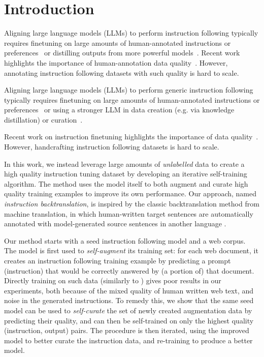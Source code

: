 \section{Introduction}


Aligning large language models (LLMs) to perform instruction following typically requires finetuning on large amounts of human-annotated instructions or preferences~\citep{ouyang2022training,touvron2023llama, bai2022training}  or distilling outputs from more powerful models~\citep{wang2022self,honovich2022unnatural,alpaca,vicuna2023,peng2023instruction,xu2023wizardlm}.
Recent work highlights the importance of human-annotation data quality~\citep{zhou2023lima,kopf2023openassistant}. However, annotating instruction following datasets with such quality is hard to scale. 


Aligning large language models (LLMs) to perform generic instruction following typically requires finetuning on large amounts of human-annotated instructions or preferences~\citep{ouyang2022training,touvron2023llama, bai2022training} or using a stronger LLM in data creation (e.g. via knowledge distillation) or curation~\citep{wang2022self,honovich2022unnatural,alpaca,vicuna2023,peng2023instruction,xu2023wizardlm}.
 
Recent work on instruction finetuning highlights the importance of data quality~\cite{zhou2023lima,kopf2023openassistant}. However, handcrafting instruction following datasets is hard to scale. 
\fi

In this work, we instead leverage large amounts of \emph{unlabelled} data to create a high quality instruction tuning dataset by developing an iterative self-training algorithm. The method uses the model itself to both augment  and curate
high quality  training examples to improve its own performance. Our approach, named {\em instruction backtranslation}, is inspired by the classic {backtranslation} method from machine translation, in which human-written target sentences are automatically annotated with model-generated source sentences in another language \citep{sennrich2015improving}. 

Our method starts with a seed instruction following model and a web corpus. The model is first used to \textit{self-augment} its training set: for each web document, it creates an instruction following training example by predicting a  prompt (instruction) that would be correctly answered by (a portion of) that document. Directly training on such data (similarly to \cite{koksal2023longform}) gives poor results in our experiments, 
both because of the mixed quality of human written web text, and noise in the generated instructions. To remedy this, we show that the same seed model can be used to \textit{self-curate}
the set of newly created augmentation data by predicting their quality, and  can then be  self-trained on only the highest quality (instruction, output) pairs. 
The procedure is then iterated, using the improved model to better curate the instruction  data, and re-training to produce a better model.



